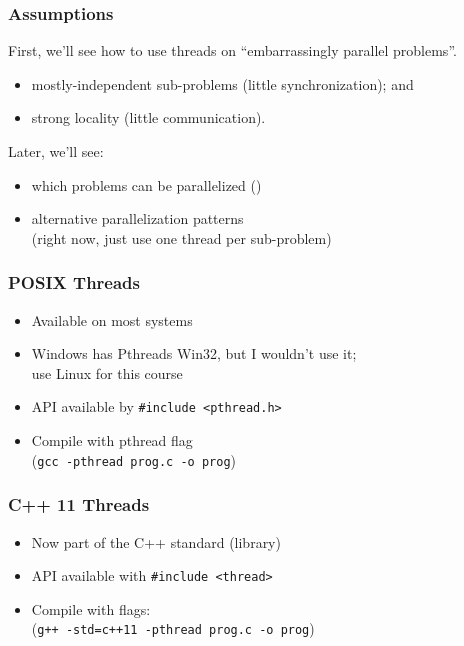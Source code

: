\begin{frame}
  \frametitle{Assumptions}


  First, we'll see how to use threads on ``embarrassingly parallel problems''.
  \begin{itemize}
    \item mostly-independent sub-problems (little synchronization); and
    \item strong locality (little communication).
  \end{itemize}
  \vfill
  Later, we'll see:
  \begin{itemize}
    \item which problems can be parallelized ()
    \item alternative parallelization patterns\\(right now, just use one thread
          per sub-problem)
  \end{itemize}

\end{frame}

\begin{frame}
  \frametitle{POSIX Threads}


  \begin{itemize}
    \item Available on most systems
    \vfill
    \item Windows has Pthreads Win32, but I wouldn't use it; \\use Linux for
          this course
    \vfill
    \item API available by {\tt \#include <pthread.h>}
    \vfill
    \item Compile with pthread flag \\ ({\tt gcc -pthread prog.c -o prog})
  \end{itemize}

\end{frame}


\begin{frame}[fragile]
  \frametitle{C++ 11 Threads}


  \begin{itemize}
    \item Now part of the C++ standard (library)
    \vfill
    \item API available with {\tt \#include <thread>}
    \vfill
    \item Compile with flags: \\ (\verb!g++ -std=c++11 -pthread prog.c -o prog!)
  \end{itemize}

\end{frame}


